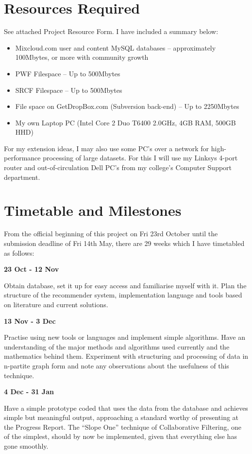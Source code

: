 \section{Resources Required}
See attached Project Resource Form. I have included a summary below:
\begin{itemize}
\item Mixcloud.com user and content MySQL databases -- approximately 100Mbytes, or more with community growth
\item PWF Filespace -- Up to 500Mbytes
\item SRCF Filespace  -- Up to 500Mbytes
\item File space on GetDropBox.com (Subversion back-end) -- Up to 2250Mbytes
\item My own Laptop PC (Intel Core 2 Duo T6400 2.0GHz, 4GB RAM, 500GB HHD)
\end{itemize}
For my extension ideas, I may also use some PC's over a network for high-performance processing of large datasets. For this I will use my Linksys 4-port router and out-of-circulation Dell PC's from my college's Computer Support department.


\section{Timetable and Milestones}

From the official beginning of this project on Fri 23rd October until the submission deadline of Fri 14th May, there are 29 weeks which I have timetabled as follows:

\vfill
\eject

\textbf{23 Oct - 12 Nov}

Obtain database, set it up for easy access and familiarise myself with it.
Plan the structure of the recommender system, implementation language and tools based on literature and current solutions.

\textbf{13 Nov - 3 Dec}

Practise using new tools or languages and implement simple algorithms.
Have an understanding of the major methods and algorithms used currently and the mathematics behind them.
Experiment with structuring and processing of data in n-partite graph form and note any observations about the usefulness of this technique.

\textbf{4 Dec - 31 Jan}

Have a simple prototype coded that uses the data from the database and achieves simple but meaningful output, approaching a standard worthy of presenting at the Progress Report. The ``Slope One'' technique of Collaborative Filtering, one of the simplest, should by now be implemented, given that everything else has gone smoothly.

